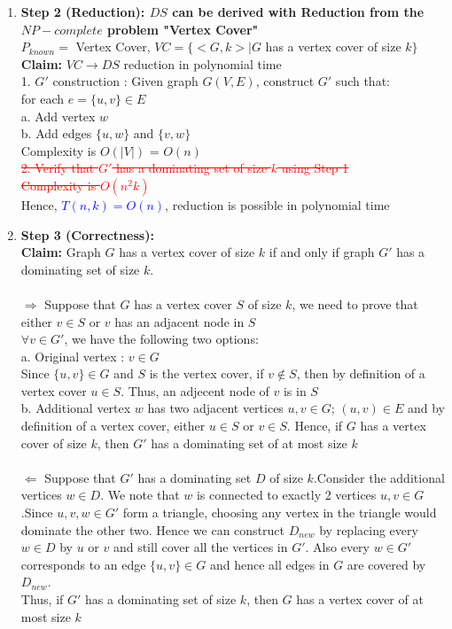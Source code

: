 \documentclass{article}
\newcommand{\add}[1]{\textcolor{dkgreen}{#1}}
\newcommand{\rmv}[1]{\textcolor{red}{\sout{#1}}}
\begin{document}
\begin{enumerate}
\begin{enumerate}
   \item\textbf{Step 2 (Reduction): $DS$ can be derived with Reduction from the $NP-complete$ problem "Vertex Cover" } \\
   $P_{known} =$ Vertex Cover, $VC =\{<G,k>| G$ has a vertex cover of size $k\}$\\
   \textbf{Claim:} $VC \rightarrow DS$ reduction in polynomial time \\
   1. $G'$ construction :  Given graph $G(V,E)$, construct $G'$ such that:\\
   for each $ e=\{u,v\} \in E$\\
   a. Add vertex $w$\\
   b. Add edges $\{u,w\}$ and $\{v,w\}$\\
   Complexity is $O(\left|V\right|)$ = $O(n)$\\
   \rmv{2. Verify that $G'$ has a dominating set of size $k$ using Step 1}\\
   \rmv{Complexity is $O(n^2k)$}\\
   Hence,  \textcolor{blue} { $T(n,k) = O(n)$}, 
   reduction is possible in polynomial time\\
   \item\textbf{Step 3 (Correctness): } \\
   \textbf{Claim:} Graph $G$ has a vertex cover of size $k$ if and only if graph $G'$ has a dominating set of size $k$.\\ \\
   $\Rightarrow$ Suppose that $G$ has a vertex cover $S$ of size $k$, we need to prove that either $v \in S$ or $v$ has an adjacent node in $S$ \\
   $\forall v \in G'$, we have the following two options:\\
   a. Original vertex : $v \in G$ \\
   Since $\{u,v\} \in G$ and $S$ is the vertex cover, if $v \notin S$, then by definition of a vertex cover $u \in S$. Thus, an adjecent node of $v$ is in $S$\\
   b. Additional vertex $w$ has two adjacent vertices $u, v \in G$; \add{$(u,v) \in E $} and by definition of a vertex cover, either $u \in S$ or $v \in S$.
   Hence, if $G$ has a vertex cover of size $k$, then $G'$ has a dominating set of at most size $k$\\ \\
   $\Leftarrow$ Suppose that $G'$ has a dominating set $D$ of size $k$.Consider the additional vertices $w \in D$. We note that $w$ is connected to exactly 2 vertices $u,v \in G$.Since $u,v,w \in G'$ form a triangle, choosing any vertex in the triangle would dominate the other two. Hence we can construct $D_{new}$ by replacing every $w \in D$ by $u$ or $v$ and still cover all the vertices in $G'$. Also every $w \in G'$ corresponds to an edge $\{u,v\} \in G$ and hence all edges in $G$ are covered by $D_{new}$.\\
   Thus, if $G'$ has a dominating set of size $k$, then $G$ has a vertex cover of at most size $k$\\
  \end{enumerate}
\end{enumerate}
\end{document}
